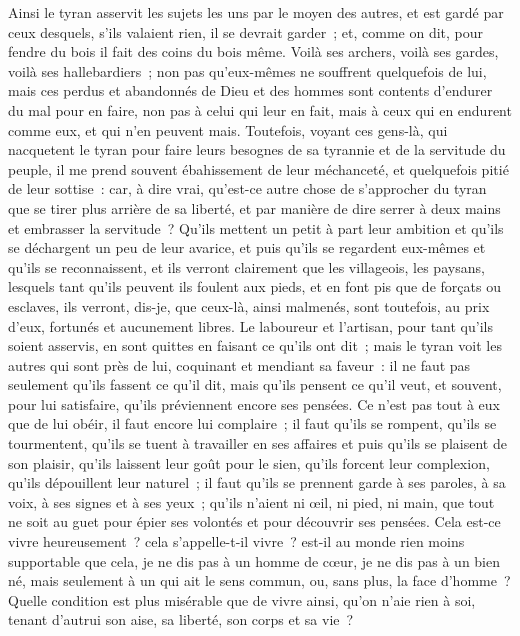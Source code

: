 \documentclass[french,twoside]{book} %
\begin{document}
Ainsi le tyran asservit les sujets les uns par le moyen des autres, et est gardé par ceux desquels, s’ils valaient rien, il se devrait garder ; et, comme on dit, pour fendre du bois il fait des coins du bois même. Voilà ses archers, voilà ses gardes, voilà ses hallebardiers ; non pas qu’eux-mêmes ne souffrent quelquefois de lui, mais ces perdus et abandonnés de Dieu et des hommes sont contents d’endurer du mal pour en faire, non pas à celui qui leur en fait, mais à ceux qui en endurent comme eux, et qui n’en peuvent mais. Toutefois, voyant ces gens-là, qui nacquetent le tyran pour faire leurs besognes de sa tyrannie et de la servitude du peuple, il me prend souvent ébahissement de leur méchanceté, et quelquefois pitié de leur sottise : car, à dire vrai, qu’est-ce autre chose de s’approcher du tyran que se tirer plus arrière de sa liberté, et par manière de dire serrer à deux mains et embrasser la servitude ? Qu’ils mettent un petit à part leur ambition et qu’ils se déchargent un peu de leur avarice, et puis qu’ils se regardent eux-mêmes et qu’ils se reconnaissent, et ils verront clairement que les villageois, les paysans, lesquels tant qu’ils peuvent ils foulent aux pieds, et en font pis que de forçats ou esclaves, ils verront, dis-je, que ceux-là, ainsi malmenés, sont toutefois, au prix d’eux, fortunés et aucunement libres. Le laboureur et l’artisan, pour tant qu’ils soient asservis, en sont quittes en faisant ce qu’ils ont dit ; mais le tyran voit les autres qui sont près de lui, coquinant et mendiant sa faveur : il ne faut pas seulement qu’ils fassent ce qu’il dit, mais qu’ils pensent ce qu’il veut, et souvent, pour lui satisfaire, qu’ils préviennent encore ses pensées. Ce n’est pas tout à eux que de lui obéir, il faut encore lui complaire ; il faut qu’ils se rompent, qu’ils se tourmentent, qu’ils se tuent à travailler en ses affaires et puis qu’ils se plaisent de son plaisir, qu’ils laissent leur goût pour le sien, qu’ils forcent leur complexion, qu’ils dépouillent leur naturel ; il faut qu’ils se prennent garde à ses paroles, à sa voix, à ses signes et à ses yeux ; qu’ils n’aient ni œil, ni pied, ni main, que tout ne soit au guet pour épier ses volontés et pour découvrir ses pensées. Cela est-ce vivre heureusement ? cela s’appelle-t-il vivre ? est-il au monde rien moins supportable que cela, je ne dis pas à un homme de cœur, je ne dis pas à un bien né, mais seulement à un qui ait le sens commun, ou, sans plus, la face d’homme ? Quelle condition est plus misérable que de vivre ainsi, qu’on n’aie rien à soi, tenant d’autrui son aise, sa liberté, son corps et sa vie ?\par
\end{document}
